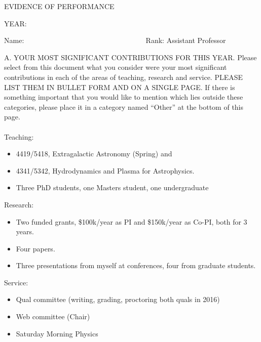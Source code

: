 \addtolength{\topmargin}{-.5in}
\addtolength{\textheight}{2.5cm}
\addtolength{\oddsidemargin}{-.75in}
\addtolength{\evensidemargin}{-.75in}
\addtolength{\textwidth}{.5in}


\centerline{EVIDENCE OF PERFORMANCE}
\bigskip
\centerline{YEAR: }
\bigskip
\noindent Name: 
\hbox{\ \ \ \ \ \ \ \
\ \ \ \ \ \ \ \ \ \ \ \ \ \ \ \ \ \ \ \ \ \ \ \ \ }
Rank: \underbar
{Assistant Professor }

\vskip 20pt

\noindent A. YOUR MOST SIGNIFICANT CONTRIBUTIONS FOR THIS YEAR.
Please select from this document what you consider were your most
significant contributions in each of the areas of teaching, research
and service. PLEASE LIST THEM IN BULLET FORM AND ON A SINGLE PAGE.
If there is something important that you would like to mention which
lies outside these categories, please
place it in a category named ``Other'' at the bottom of this page. \\ \\

\noindent
Teaching:

\begin{itemize}
\item 4419/5418, Extragalactic Astronomy (Spring) and
\item 4341/5342, Hydrodynamics and Plasma for Astrophysics.  
\item Three PhD students, one Masters student, one undergraduate
\end{itemize}


\noindent
Research:

\begin{itemize}
\item Two funded grants, \$100k/year as PI and \$150k/year as Co-PI, both for 3
years.
\item Four papers.  
\item Three presentations from myself at conferences, four from
graduate students.
\end{itemize}

\noindent
Service:

\begin{itemize}
\item Qual committee (writing, grading, proctoring both quals in 2016)
\item Web committee (Chair)
\item Saturday Morning Physics
\end{itemize}



